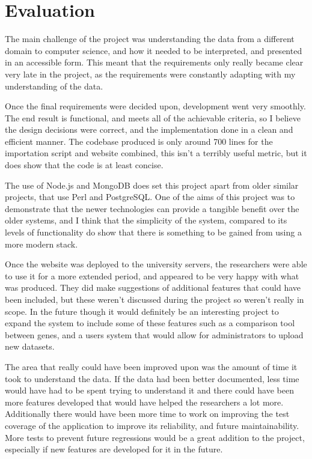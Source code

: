 \chapter{Evaluation}
The main challenge of the project was understanding the data from a different domain to computer science, and how it needed to be interpreted, and presented in an accessible form. This meant that the requirements only really became clear very late in the project, as the requirements were constantly adapting with my understanding of the data. 

Once the final requirements were decided upon, development went very smoothly. The end result is functional, and meets all of the achievable criteria, so I believe the design decisions were correct, and the implementation done in a clean and efficient manner. The codebase produced is only around 700 lines for the importation script and website combined, this isn't a terribly useful metric, but it does show that the code is at least concise.

The use of Node.js and MongoDB does set this project apart from older similar projects, that use Perl and PostgreSQL. One of the aims of this project was to demonstrate that the newer technologies can provide a tangible benefit over the older systems, and I think that the simplicity of the system, compared to its levels of functionality do show that there is something to be gained from using a more modern stack. 

Once the website was deployed to the university servers, the researchers were able to use it for a more extended period, and appeared to be very happy with what was produced. They did make suggestions of additional features that could have been included, but these weren't discussed during the project so weren't really in scope. In the future though it would definitely be an interesting project to expand the system to include some of these features such as a comparison tool between genes, and a users system that would allow for administrators to upload new datasets.

The area that really could have been improved upon was the amount of time it took to understand the data. If the data had been better documented, less time would have had to be spent trying to understand it and there could have been more features developed that would have helped the researchers a lot more. Additionally there would have been more time to work on improving the test coverage of the application to improve its reliability, and future maintainability. More tests to prevent future regressions would be a great addition to the project, especially if new features are developed for it in the future.


